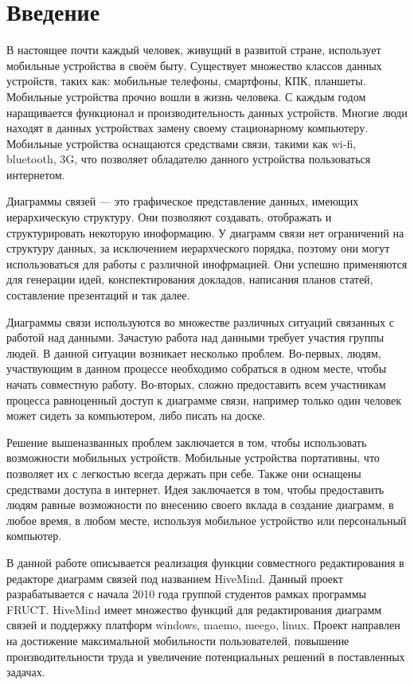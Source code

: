 \newpage

\chapter*{Введение}
\label{chap:introduction}

В настоящее почти каждый человек, живущий в развитой стране, использует
мобильные устройства в своём быту. Существует множество классов данных
устройств, таких как: мобильные телефоны, смартфоны, КПК, планшеты.
Мобильные устройства прочно вошли в жизнь человека. С каждым годом наращивается
функционал и производительность данных устройств. Многие люди
находят в данных устройствах замену своему стационарному компьютеру. Мобильные устройства
оснащаются средствами связи, такими как wi-fi, bluetooth, 3G, что позволяет
обладателю данного устройства пользоваться интернетом.

Диаграммы связей --- это графическое представление данных, имеющих
иерархическую структуру. Они позволяют создавать, отображать и
структурировать некоторую иноформацию. У диаграмм связи нет ограничений на
структуру данных, за исключением иерархческого порядка, поэтому они могут
использоваться для работы с различной инофрмацией. Они успешно
применяются для генерации идей, конспектирования докладов, написания планов
статей, составление презентаций и так далее.

Диаграммы связи используются во множестве различных ситуаций связанных с работой
над данными. Зачастую работа над данными требует участия группы людей. В данной
ситуации возникает несколько проблем. Во-первых, людям, участвующим в данном
процессе необходимо собраться в одном месте, чтобы начать совместную работу.
Во-вторых, сложно предоставить всем участникам процесса равноценный доступ к
диаграмме связи, например только один человек может сидеть за компьютером, либо
писать на доске.

Решение вышеназванных проблем заключается в том, чтобы использовать возможности
мобильных устройств. Мобильные устройства портативны, что позволяет их с
легкостью всегда держать при себе. Также они оснащены средствами доступа в
интернет. Идея заключается в том, чтобы предоставить людям равные возможности по
внесению своего вклада в создание диаграмм, в любое время, в любом месте,
используя мобильное устройство или персональный компьютер.

В данной работе описывается реализация функции совместного редактирования в
редакторе диаграмм связей под названием HiveMind. Данный проект разрабатывается
с начала 2010 года группой студентов рамках программы FRUCT. HiveMind имеет
множество функций для редактирования диаграмм связей и поддержку платформ
windows, maemo, meego, linux. Проект направлен на достижение максимальной
мобильности пользователей, повышение производительности труда и увеличение
потенциальных решений в поставленных задачах.

